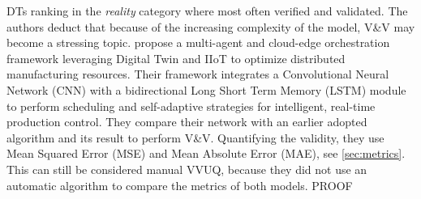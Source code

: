DTs ranking in the \textit{reality} category where most often verified and validated. The authors deduct that because of the increasing complexity of the model, V&V may become a stressing topic. \Autocite{Nie2023rcim} propose a multi-agent and cloud-edge orchestration framework leveraging Digital Twin and IIoT to optimize distributed manufacturing resources. Their framework integrates a Convolutional Neural Network (CNN) with a bidirectional Long Short Term Memory (LSTM) module to perform scheduling and self-adaptive strategies for intelligent, real-time production control. They compare their network with an earlier adopted algorithm and its result to perform V&V. Quantifying the validity, they use Mean Squared Error (MSE) and Mean Absolute Error (MAE), see \autoref{sec:metrics}. This can still be considered manual VVUQ, because they did not use an automatic algorithm to compare the metrics of both models. PROOF
